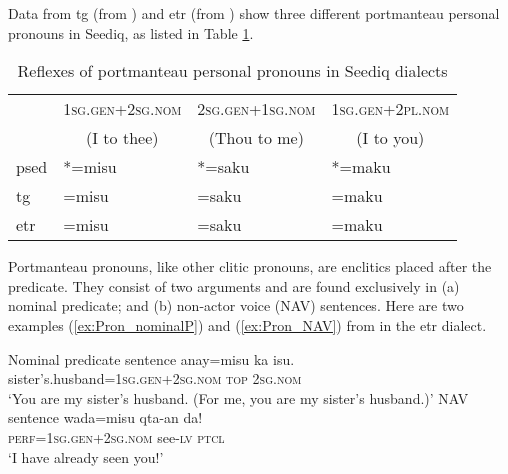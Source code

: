 Data from \acl{tg} (from \cite[62]{Sung2018Sedgrammar}) and \acl{etr} (from \cite[74]{Lee2018Trugrammar}) show three different portmanteau personal pronouns in Seediq, as listed in Table \ref{tab:porref}.

\begin{table}[!htbp]
\centering
\caption{Reflexes of portmanteau personal pronouns in Seediq dialects}
\label{tab:porref}
\begin{tabular}{llll}
\hline
                     & \textsc{1sg.gen+2sg.nom}                 & \textsc{2sg.gen+1sg.nom}                  & \textsc{1sg.gen+2pl.nom}                \\ 
\multicolumn{1}{c}{} & \multicolumn{1}{c}{(I to thee)} & \multicolumn{1}{c}{(Thou to me)} & \multicolumn{1}{c}{(I to you)} \\ \hline
\acl{psed}               & *=misu                          & *=saku                           & *=maku                         \\
\acs{tg}                 & =misu                           & =saku                            & =maku                          \\
\acs{etr}                & =misu                           & =saku                            & =maku          \\ \hline                
\end{tabular}
\end{table}

Portmanteau pronouns, like other clitic pronouns, are enclitics placed after the predicate. They consist of two arguments and are found exclusively in (a) nominal predicate; and (b) non-actor voice (NAV) sentences. Here are two examples (\ref{ex:Pron_nominalP}) and (\ref{ex:Pron_NAV}) from \textcite[74--75]{Lee2018Trugrammar} in the \acl{etr} dialect.

\begin{exe}

    \ex Nominal predicate sentence \label{ex:Pron_nominalP}
    \gll anay=misu ka isu. \\
    sister's.husband=\textsc{1sg.gen+2sg.nom} \textsc{top} \textsc{2sg.nom}\\
    \glt `You are my sister's husband. (For me, you are my sister's husband.)'
    \ex NAV sentence \label{ex:Pron_NAV}
    \gll wada=misu qta-an da! \\
    \textsc{perf}=\textsc{1sg.gen+2sg.nom} see-\textsc{lv} \textsc{ptcl}\\
    \glt `I have already seen you!'
\end{exe}

